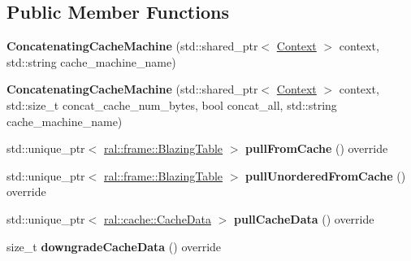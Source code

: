\subsection*{Public Member Functions}
\begin{DoxyCompactItemize}
\item 
\mbox{\label{classral_1_1cache_1_1ConcatenatingCacheMachine_ac63a832595832d436951d12acfb11971}} 
{\bfseries Concatenating\+Cache\+Machine} (std\+::shared\+\_\+ptr$<$ \hyperlink{classblazingdb_1_1manager_1_1Context}{Context} $>$ context, std\+::string cache\+\_\+machine\+\_\+name)
\item 
\mbox{\label{classral_1_1cache_1_1ConcatenatingCacheMachine_a965ed85fea8f3dfec4792fbac8001391}} 
{\bfseries Concatenating\+Cache\+Machine} (std\+::shared\+\_\+ptr$<$ \hyperlink{classblazingdb_1_1manager_1_1Context}{Context} $>$ context, std\+::size\+\_\+t concat\+\_\+cache\+\_\+num\+\_\+bytes, bool concat\+\_\+all, std\+::string cache\+\_\+machine\+\_\+name)
\item 
\mbox{\label{classral_1_1cache_1_1ConcatenatingCacheMachine_a0dc01ef4e13b5f832d52f2d07d1f1f69}} 
std\+::unique\+\_\+ptr$<$ \hyperlink{classral_1_1frame_1_1BlazingTable}{ral\+::frame\+::\+Blazing\+Table} $>$ {\bfseries pull\+From\+Cache} () override
\item 
\mbox{\label{classral_1_1cache_1_1ConcatenatingCacheMachine_a9c8db51d9971f78ff74134db114bb69a}} 
std\+::unique\+\_\+ptr$<$ \hyperlink{classral_1_1frame_1_1BlazingTable}{ral\+::frame\+::\+Blazing\+Table} $>$ {\bfseries pull\+Unordered\+From\+Cache} () override
\item 
\mbox{\label{classral_1_1cache_1_1ConcatenatingCacheMachine_af02b87583c465b8d90b451288e16cdc5}} 
std\+::unique\+\_\+ptr$<$ \hyperlink{classral_1_1cache_1_1CacheData}{ral\+::cache\+::\+Cache\+Data} $>$ {\bfseries pull\+Cache\+Data} () override
\item 
\mbox{\label{classral_1_1cache_1_1ConcatenatingCacheMachine_a04db0538230cd10cf7ae4ebc1cd62167}} 
size\+\_\+t {\bfseries downgrade\+Cache\+Data} () override
\end{DoxyCompactItemize}
